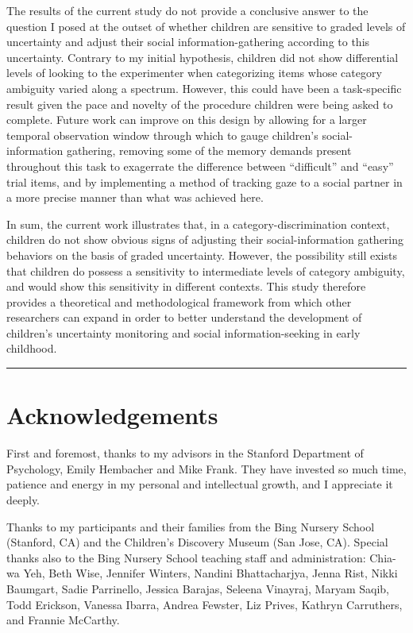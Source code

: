 \documentclass[,man,floatsintext]{apa6}
\begin{document}
The results of the current study do not provide a conclusive answer to the question I posed at the outset of whether children are sensitive to graded levels of uncertainty and adjust their social information-gathering according to this uncertainty. Contrary to my initial hypothesis, children did not show differential levels of looking to the experimenter when categorizing items whose category ambiguity varied along a spectrum. However, this could have been a task-specific result given the pace and novelty of the procedure children were being asked to complete. Future work can improve on this design by allowing for a larger temporal observation window through which to gauge children's social-information gathering, removing some of the memory demands present throughout this task to exagerrate the difference between \enquote{difficult} and \enquote{easy} trial items, and by implementing a method of tracking gaze to a social partner in a more precise manner than what was achieved here.

In sum, the current work illustrates that, in a category-discrimination context, children do not show obvious signs of adjusting their social-information gathering behaviors on the basis of graded uncertainty. However, the possibility still exists that children do possess a sensitivity to intermediate levels of category ambiguity, and would show this sensitivity in different contexts. This study therefore provides a theoretical and methodological framework from which other researchers can expand in order to better understand the development of children's uncertainty monitoring and social information-seeking in early childhood.

\begin{center}\rule{0.5\linewidth}{\linethickness}\end{center}

\hypertarget{acknowledgements}{%
\section{Acknowledgements}\label{acknowledgements}}

First and foremost, thanks to my advisors in the Stanford Department of Psychology, Emily Hembacher and Mike Frank. They have invested so much time, patience and energy in my personal and intellectual growth, and I appreciate it deeply.

Thanks to my participants and their families from the Bing Nursery School (Stanford, CA) and the Children's Discovery Museum (San Jose, CA). Special thanks also to the Bing Nursery School teaching staff and administration: Chia-wa Yeh, Beth Wise, Jennifer Winters, Nandini Bhattacharjya, Jenna Rist, Nikki Baumgart, Sadie Parrinello, Jessica Barajas, Seleena Vinayraj, Maryam Saqib, Todd Erickson, Vanessa Ibarra, Andrea Fewster, Liz Prives, Kathryn Carruthers, and Frannie McCarthy.
\end{document}
